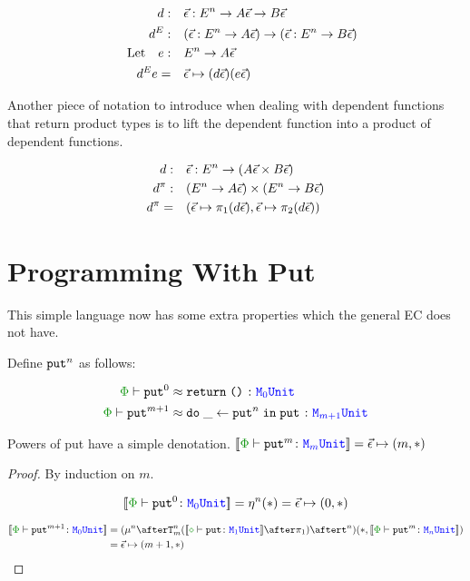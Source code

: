 \documentclass{Report}
\newcommand{\zptyperelation}[2]{\typerelation{\P}{#1}{#2}}
\newcommand{\zpberelation}[2]{\berelation{\P}{#1}{#2}}
\newcommand{\fapply}[0]{^E}
\newcommand\liftp[0]{^\pi}
\begin{document}
\begin{align*}
    d:&\quad\ev:E^n \rightarrow A\ev \rightarrow B\ev\\
    d\fapply:&\quad (\ev:E^n\rightarrow A\ev) \rightarrow (\ev: E^n\rightarrow B\ev)\\
    \qt{Let}\quad e:&\quad E^n \rightarrow A\ev\\
    d\fapply e=&\quad \ev\mapsto (d\ev)(e\ev)
\end{align*}

Another piece of notation to introduce when dealing with dependent functions that return product types is to lift the dependent function into a product of dependent functions.

\begin{align*}
    d:&\quad \ev:E^n \rightarrow (A\ev\times B\ev)
    \\
    d\liftp:&\quad (E^n\rightarrow A\ev)\times(E^n\rightarrow B\ev)\\
    d\liftp=&\quad(\ev\mapsto \p(d\ev), \ev\mapsto \pp(d\ev))
\end{align*}


\section{Programming With Put}

This simple language now has some extra properties which the general EC does not have.

\begin{definition}
Define $\texttt{put}^n$ as follows:

\begin{align*}
    \label{PutnDefinition}
    \zpberelation{\put^0}{&{\s}\return{\u}}{\M{0}{\U}}\\ 
    \zpberelation{\put^{m+1}}{&{\s}\doin{\_}{\put^n}{\put}}{\M{m+1}{\U}}
\end{align*}
\end{definition}


\begin{lemma}
    Powers of put have a simple denotation.
$\deno{\zptyperelation{\put^m}{\M{m}{\U}}} = \ev\mapsto(m, \singleton)$    
\end{lemma}

\begin{proof}
    By induction on $m$.

    
    \begin{equation}
        \deno{\zptyperelation{\put^0}{\M{0}{\U}}} = \pointn{}(\singleton) = \ev\mapsto(0, \singleton)
    \end{equation}
    
    \begin{align*}
        \deno{\zptyperelation{\put^{m+1}}{\M{0}{\U}}} & = (\bindmu^n\after\Tn{m}{(\deno{\typerelation{\nil}{\put}{\M{1}{\U}}}\after\p)}\after \strengtht^n)(\singleton, \deno{\zptyperelation{\put^m}{\M{n}{\U}}})\\
        & = \ev\mapsto(m+1, \singleton)
    \end{align*}
\end{proof}
\end{document}
